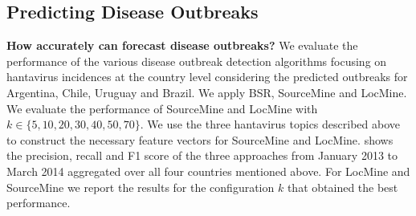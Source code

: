 \documentclass[conference]{IEEEtran}
\newcommand{\fullmodel}{{{\sf SourceMine}}\xspace}
\newcommand{\locationmodel}{{\sf LocMine}\xspace}
\begin{document}
\subsection{Predicting Disease Outbreaks}
\noindent\textbf{How accurately can {} forecast disease outbreaks?} We evaluate the performance of the various disease outbreak detection algorithms focusing on hantavirus incidences at the country level considering the predicted outbreaks for Argentina, Chile, Uruguay and Brazil.  We apply BSR,  \fullmodel and \locationmodel. We evaluate the performance of \fullmodel and \locationmodel with $k \in \{5,10,20,30,40,50,70\}$. We use the three hantavirus topics described above to construct the necessary feature vectors for \fullmodel and \locationmodel.   shows the precision, recall and F1 score  of the three approaches from January 2013 to March 2014 aggregated over all four countries mentioned above. For \locationmodel and \fullmodel we report the results for the configuration $k$ that obtained the best performance. 
\end{document}
